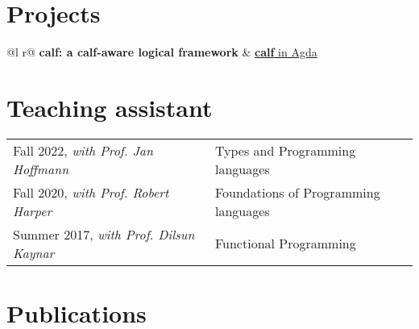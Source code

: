 \documentclass[a4paper,12pt]{article}
\begin{document}
\section{Projects}

\begin{tabularx}{\linewidth}{ @{}l r@{} }
\textbf{calf: a \textbf{c}alf-\textbf{a}ware \textbf{l}ogical \textbf{f}ramework} & \hfill \href{https://github.com/jonsterling/agda-calf}{\textbf{calf} in Agda} \\[3.75pt]
\end{tabularx}

\section{Teaching assistant} 

\begin{tabularx}{\linewidth}{ @{}l l@{} }
  Fall 2022, \emph{with Prof. Jan Hoffmann} & Types and Programming languages\\
  Fall 2020, \emph{with Prof. Robert Harper} & Foundations of Programming languages\\ 
  Summer 2017, \emph{with Prof. Dilsun Kaynar} & Functional Programming
\end{tabularx}



\section{Publications}
\begin{refsection}
\nocite{*}
\printbibliography[heading=none]
\end{refsection}


\vfill
{}
\end{document}
